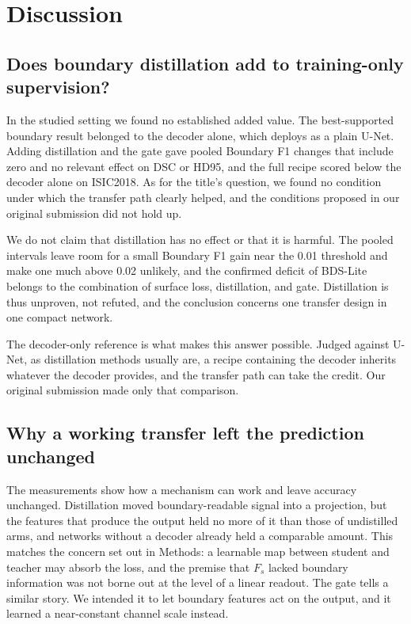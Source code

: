 \documentclass[fleqn,10pt,lineno]{wlpeerj}
\begin{document}
\section*{Discussion}

\subsection*{Does boundary distillation add to training-only supervision?}
In the studied setting we found no established added value. The best-supported boundary result belonged to the decoder alone, which deploys as a plain U-Net. Adding distillation and the gate gave pooled Boundary F1 changes that include zero and no relevant effect on DSC or HD95, and the full recipe scored below the decoder alone on ISIC2018. As for the title's question, we found no condition under which the transfer path clearly helped, and the conditions proposed in our original submission did not hold up.

We do not claim that distillation has no effect or that it is harmful. The pooled intervals leave room for a small Boundary F1 gain near the 0.01 threshold and make one much above 0.02 unlikely, and the confirmed deficit of BDS-Lite belongs to the combination of surface loss, distillation, and gate. Distillation is thus unproven, not refuted, and the conclusion concerns one transfer design in one compact network.

The decoder-only reference is what makes this answer possible. Judged against U-Net, as distillation methods usually are, a recipe containing the decoder inherits whatever the decoder provides, and the transfer path can take the credit. Our original submission made only that comparison.

\subsection*{Why a working transfer left the prediction unchanged}
The measurements show how a mechanism can work and leave accuracy unchanged. Distillation moved boundary-readable signal into a projection, but the features that produce the output held no more of it than those of undistilled arms, and networks without a decoder already held a comparable amount. This matches the concern set out in Methods: a learnable map between student and teacher may absorb the loss, and the premise that $F_s$ lacked boundary information was not borne out at the level of a linear readout. The gate tells a similar story. We intended it to let boundary features act on the output, and it learned a near-constant channel scale instead.
\end{document}
